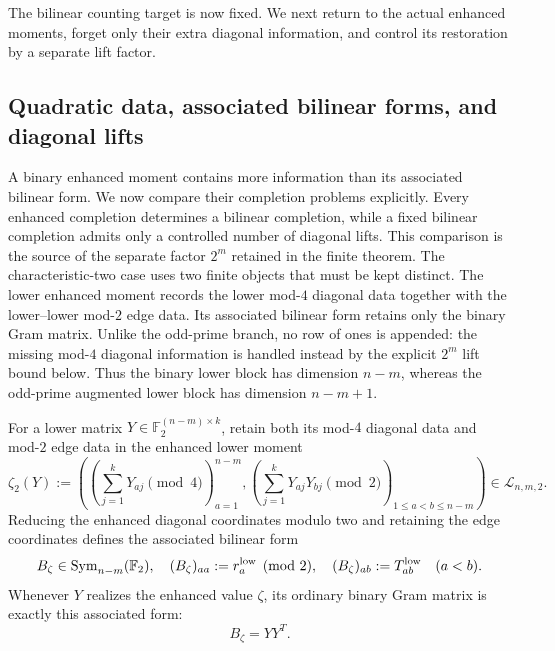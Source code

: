 \documentclass[11pt]{article}
\newcommand{\F}{\mathbb F}
\newcommand{\Sym}{\operatorname{Sym}}
\newcommand{\1}{\mathbf 1}
\theoremstyle{plain}
\theoremstyle{definition}
\theoremstyle{remark}
\begin{document}
The bilinear counting target is now fixed.  We next return to the actual
enhanced moments, forget only their extra diagonal information, and control its
restoration by a separate lift factor.

\subsection{Quadratic data, associated bilinear forms, and diagonal lifts}
A binary enhanced moment contains more information than its associated bilinear form.  We now compare their completion problems explicitly.  Every enhanced completion determines a bilinear completion, while a fixed bilinear completion admits only a controlled number of diagonal lifts.  This comparison is the source of the separate factor $2^m$ retained in the finite theorem.
The characteristic-two case uses two finite objects that must be kept distinct.  The
lower enhanced moment records the lower mod-$4$ diagonal data together with
the lower--lower mod-$2$ edge data.  Its associated bilinear form retains only the
binary Gram matrix.  Unlike the odd-prime branch, no row of ones is appended:
the missing mod-$4$ diagonal information is handled instead by the explicit
$2^m$ lift bound below.  Thus the binary lower block has dimension $n-m$,
whereas the odd-prime augmented lower block has dimension $n-m+1$.

For a lower matrix $Y\in\F_2^{(n-m)\times k}$, retain both its mod-$4$
diagonal data and mod-$2$ edge data in the enhanced lower moment
\begin{equation}
 \zeta_2(Y)
 :=\left(
   \left(\sum_{j=1}^kY_{aj}\pmod4\right)_{a=1}^{n-m},
   \left(\sum_{j=1}^kY_{aj}Y_{bj}\pmod2\right)_{1\le a<b\le n-m}
   \right)
 \in\mathcal L_{n,m,2}.
 \label{eq:binary-lower-enhanced-moment-of-Y}
\end{equation}
Reducing the enhanced diagonal coordinates modulo two and retaining the edge
coordinates defines the associated bilinear form
\begin{equation}
 B_\zeta\in\Sym_{n-m}(\F_2),
 \quad
 (B_\zeta)_{aa}:=r_a^{\rm low}\pmod2,
 \quad
 (B_\zeta)_{ab}:=T_{ab}^{\rm low}\quad(a<b).
 \label{eq:binary-bilinear-shadow}
\end{equation}
Whenever $Y$ realizes the enhanced value $\zeta$, its ordinary binary Gram
matrix is exactly this associated form:
\begin{equation}
 B_\zeta=YY^T.
 \label{eq:binary-shadow-is-Gram}
\end{equation}
\end{document}
